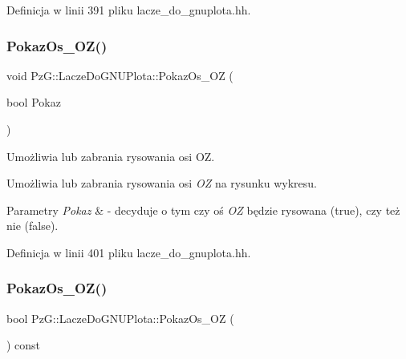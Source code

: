 Definicja w linii 391 pliku lacze\+\_\+do\+\_\+gnuplota.\+hh.

\mbox{\label{class_pz_g_1_1_lacze_do_g_n_u_plota_a9fabfe88cb1801a5de8923f45f514b99}} 
\subsubsection{\texorpdfstring{Pokaz\+Os\+\_\+\+O\+Z()}{PokazOs\_OZ()}\hspace{0.1cm}{\footnotesize\ttfamily [1/2]}}
{\footnotesize\ttfamily void Pz\+G\+::\+Lacze\+Do\+G\+N\+U\+Plota\+::\+Pokaz\+Os\+\_\+\+OZ (\begin{DoxyParamCaption}\item[{bool}]{Pokaz }\end{DoxyParamCaption})\hspace{0.3cm}{\ttfamily [inline]}}



Umożliwia lub zabrania rysowania osi OZ. 

Umożliwia lub zabrania rysowania osi {\itshape OZ} na rysunku wykresu. 
\begin{DoxyParams}{Parametry}
{\em Pokaz} & -\/ decyduje o tym czy oś {\itshape OZ} będzie rysowana ({\ttfamily true}), czy też nie ({\ttfamily false}). \\
\hline
\end{DoxyParams}


Definicja w linii 401 pliku lacze\+\_\+do\+\_\+gnuplota.\+hh.

\mbox{\label{class_pz_g_1_1_lacze_do_g_n_u_plota_a22c708af33c57bf3b5d1b4e82b4017b7}} 
\subsubsection{\texorpdfstring{Pokaz\+Os\+\_\+\+O\+Z()}{PokazOs\_OZ()}\hspace{0.1cm}{\footnotesize\ttfamily [2/2]}}
{\footnotesize\ttfamily bool Pz\+G\+::\+Lacze\+Do\+G\+N\+U\+Plota\+::\+Pokaz\+Os\+\_\+\+OZ (\begin{DoxyParamCaption}{ }\end{DoxyParamCaption}) const\hspace{0.3cm}{\ttfamily [inline]}}



